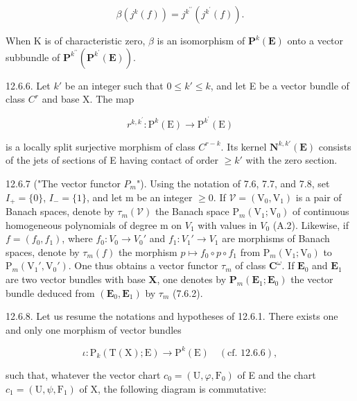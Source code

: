 \[
\beta (j ^ {k} (f)) = j ^ {k ^ {\prime \prime}} (j ^ {k ^ {\prime}} (f)).
\]

When K is of characteristic zero, \(\beta\) is an isomorphism of \(\mathbf{P}^{k}(\mathbf{E})\) onto a vector subbundle of \(\mathbf{P}^{k^{\prime\prime}}(\mathbf{P}^{k^{\prime}}(\mathbf{E}))\).

12.6.6. Let \(k'\) be an integer such that \(0 \leqslant k' \leqslant k\), and let E be a vector bundle of class \(C^r\) and base X. The map

\[
r ^ {k, k ^ {\prime}}: \mathrm{P} ^ {k} (\mathrm{E}) \rightarrow \mathrm{P} ^ {k ^ {\prime}} (\mathrm{E})
\]

is a locally split surjective morphism of class \(C^{r-k}\). Its kernel \(\mathbf{N}^{k,k'}(\mathbf{E})\) consists of the jets of sections of E having contact of order \(\geqslant k'\) with the zero section.

12.6.7 ("The vector functor \(P_{m}\)"). Using the notation of 7.6, 7.7, and 7.8, set \(I_{+} = \{0\}\), \(I_{-} = \{1\}\), and let m be an integer \(\geqslant 0\). If \(\mathcal{V} = (\mathrm{V}_{0}, \mathrm{V}_{1})\) is a pair of Banach spaces, denote by \(\tau_{m}(\mathcal{V})\) the Banach space \(\mathrm{P}_{m}(\mathrm{V}_{1}; \mathrm{V}_{0})\) of continuous homogeneous polynomials of degree m on \(V_{1}\) with values in \(V_{0}\) (A.2). Likewise, if \(f = (f_{0}, f_{1})\), where \(f_{0}: V_{0} \to V_{0}'\) and \(f_{1}: V_{1}' \to V_{1}\) are morphisms of Banach spaces, denote by \(\tau_{m}(f)\) the morphism \(p \mapsto f_{0} \circ p \circ f_{1}\) from \(\mathrm{P}_{m}(\mathrm{V}_{1}; \mathrm{V}_{0})\) to \(\mathrm{P}_{m}(\mathrm{V}_{1}', \mathrm{V}_{0}')\). One thus obtains a vector functor \(\tau_{m}\) of class \(\mathbf{C}^{\omega}\). If \(\mathbf{E}_{0}\) and \(\mathbf{E}_{1}\) are two vector bundles with base \(\mathbf{X}\), one denotes by \(\mathbf{P}_{m}(\mathbf{E}_{1};\mathbf{E}_{0})\) the vector bundle deduced from \((\mathbf{E}_{0},\mathbf{E}_{1})\) by \(\tau_{m}\) (7.6.2).

12.6.8. Let us resume the notations and hypotheses of 12.6.1. There exists one and only one morphism of vector bundles

\[
\iota\colon\mathrm{P}_{k}(\mathrm{T}(\mathrm{X});\mathrm{E})\rightarrow\mathrm{P}^{k}(\mathrm{E})\quad(\text{cf. 12.6.6}),
\]

such that, whatever the vector chart \(c_{0} = (\mathrm{U}, \varphi, \mathrm{F}_{0})\) of E and the chart \(c_{1} = (\mathrm{U}, \psi, \mathrm{F}_{1})\) of X, the following diagram is commutative:

